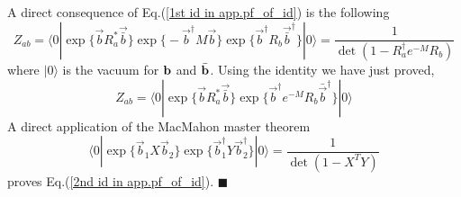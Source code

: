 A direct consequence of Eq.(\ref{1st id in app.pf_of_id}) is the following
\begin{equation}
\label{2nd id in app.pf_of_id}
Z_{ab} = \langle 0 | \exp\Big\{ \vec{b} R_a^* \vec{\bar{b}}\Big\} \exp\Big\{ - \vec{b}^{\dagger} M  \vec{b} \Big\}   \exp\Big\{  \vec{b}^{\dagger} R_b  \vec{\bar{b}}^{\dagger}\Big\}  |0  \rangle  = \frac{1}{\det( 1- R_a^{\dagger} e^{-M} R_b )} 
\end{equation}
where $|0\rangle$ is the vacuum for ${\bf b}$ and $\bar{\bf b}$. Using the identity we have just proved, 
\begin{equation}
Z_{ab} =   \langle 0 | \exp\Big\{ \vec{b} R_a^* \vec{\bar{b}}\Big\}  \exp \Big\{ \vec{b}^{\dagger} e^{-M}  R_b \bar{\vec{b}}^{\dagger}  \Big\}  |0 \rangle 
\end{equation}
A direct application of the MacMahon master theorem
\begin{equation}
  \langle 0 | \exp \Big\{ \vec{b}_1 X \vec{b}_2 \Big\}  \exp \Big\{ \vec{b}^{\dagger}_1 Y \vec{b}^{\dagger}_2 \Big\}|0  \rangle 
 = \frac{1}{\det(1 - X^T Y )}
\end{equation}
proves Eq.(\ref{2nd id in app.pf_of_id}). \hfill$\blacksquare$


